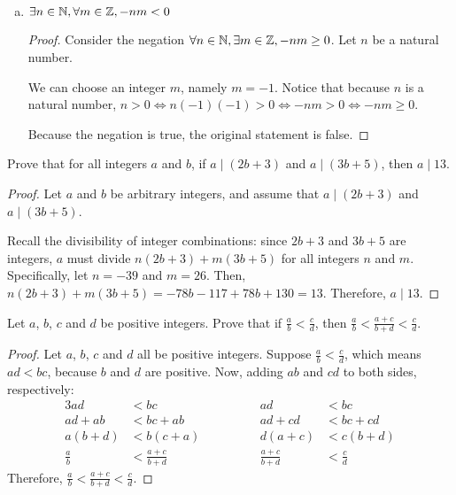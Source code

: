 \begin{enumerate}[(a)]
\begin{proof}
          Therefore, since the negation is false, the original statement is true.
        \end{proof}

  \item $\exists n\in\mathbb{N}, \forall m\in\mathbb{Z}, -nm < 0$
        \begin{proof}
          Consider the negation $\forall n\in\mathbb{N}, \exists m\in\mathbb{Z}, -nm \geq 0$.
          Let $n$ be a natural number.

          We can choose an integer $m$, namely $m=-1$.
          Notice that because $n$ is a natural number, $n > 0 \iff n(-1)(-1) > 0 \iff -nm > 0 \iff -nm \geq 0$.

          Because the negation is true, the original statement is false.
        \end{proof}
\end{enumerate}


\question Prove that for all integers $a$ and $b$, if $a \mid (2b + 3)$ and $a \mid (3b + 5)$, then $a \mid 13$.
\begin{proof}
  Let $a$ and $b$ be arbitrary integers, and assume that $a \mid (2b+3)$ and $a \mid (3b+5)$.

  Recall the divisibility of integer combinations: since $2b+3$ and $3b+5$ are integers,
  $a$ must divide $n(2b+3) + m(3b+5)$ for all integers $n$ and $m$.
  Specifically, let $n = -39$ and $m = 26$.
  Then, $n(2b+3) + m(3b+5) = -78b - 117 + 78b + 130 = 13$.
  Therefore, $a \mid 13$.
\end{proof}


\question Let $a$, $b$, $c$ and $d$ be positive integers.
Prove that if $\frac a b < \frac c d$, then $\frac a b < \frac{a+c}{b+d} < \frac c d$.
\begin{proof}
  Let $a$, $b$, $c$ and $d$ all be positive integers.
  Suppose $\frac a b < \frac c d$, which means $ad < bc$, because $b$ and $d$ are positive.
  Now, adding $ab$ and $cd$ to both sides, respectively:
  \begin{alignat*}{3}
    ad        & < bc              & \hspace{4em} ad              & < bc        \\
    ad + ab   & < bc + ab         & \hspace{4em} ad + cd         & < bc + cd   \\
    a(b+d)    & < b(c+a)          & \hspace{4em} d(a+c)          & < c(b+d)    \\
    \frac a b & < \frac{a+c}{b+d} & \hspace{4em} \frac{a+c}{b+d} & < \frac c d
  \end{alignat*}
  Therefore, $\frac a b < \frac{a+c}{b+d} < \frac c d$.
\end{proof}


